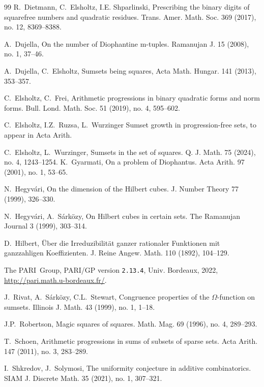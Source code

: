 \documentclass[10pt]{amsart}
\theoremstyle{plain}
\begin{document}
\begin{thebibliography}{99}
R.~Dietmann, C.~Elsholtz, I.E. Shparlinski,
Prescribing the binary digits of squarefree numbers and quadratic residues.
Trans. Amer. Math. Soc. 369 (2017), no. 12, 8369--8388. 

A.~Dujella,
On the number of Diophantine m-tuples. Ramanujan J. 15 (2008), no. 1, 37--46. 

A.~Dujella, C.~Elsholtz, Sumsets being squares,
Acta Math. Hungar. 141 (2013), 353--357. 

C.~Elsholtz, C.~Frei, 
Arithmetic progressions in binary quadratic forms and norm forms.
Bull. Lond. Math. Soc. 51 (2019), no. 4, 595--602. 

C.~Elsholtz, I.Z.~Ruzsa, L.~Wurzinger
Sumset growth in progression-free sets, to appear in Acta Arith.

C.~Elsholtz, L.~Wurzinger,
Sumsets in the set of squares.
Q. J. Math. 75 (2024), no. 4, 1243--1254. 
K.~Gyarmati, On a problem of Diophantus.
Acta Arith. 97 (2001), no. 1, 53--65. 


N.~Hegyv\'{a}ri, 
On the dimension of the Hilbert cubes. J. Number Theory 77 (1999), 326--330.

N.~Hegyv\'ari, A.~S\'ark\"ozy, On Hilbert cubes in certain sets. The
Ramanujan Journal 3 (1999), 303--314.


D.~Hilbert, \"{U}ber die Irreduzibilit\"{a}t 
ganzer rationaler Funktionen mit ganzzahligen Koeffizienten.
J. Reine Angew. Math. 110 (1892), 104--129.




 The PARI~Group, PARI/GP version \texttt{2.13.4}, Univ. Bordeaux, 2022, \url{http://pari.math.u-bordeaux.fr/}.

J.~Rivat, A.~S\'{a}rk\"{o}zy, C.L.~Stewart,
Congruence properties of the $\Omega$-function on sumsets.
Illinois J. Math. 43 (1999), no. 1, 1--18. 

J.P.~Robertson,
Magic squares of squares.
Math. Mag. 69 (1996), no. 4, 289--293.

T.~Schoen,
Arithmetic progressions in sums of subsets of sparse sets.
Acta Arith. 147 (2011), no. 3, 283--289. 


I.~Shkredov, J.~Solymosi,
The uniformity conjecture in additive combinatorics.
SIAM J. Discrete Math. 35 (2021), no. 1, 307--321. 



\end{thebibliography}
\end{document}
